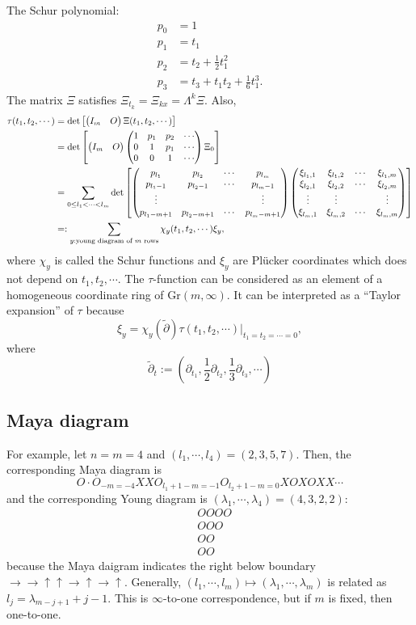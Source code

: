 \documentclass{../../../small}
\newcommand{\Gr}{\mathrm{Gr}}
\begin{document}
The Schur polynomial:
\begin{align*}
p_0&=1\\
p_1&=t_1\\
p_2&=t_2+\frac12t_1^2\\
p_3&=t_3+t_1t_2+\frac16t_1^3.
\end{align*}
The matrix $\Xi$ satisfies $\Xi_{t_k}=\Xi_{kx}=\Lambda^k\Xi$.
Also,
\begin{align*}
\tau(t_1,t_2,\cdots)
&=\det\left[\begin{pmatrix}I_m&O\end{pmatrix}\Xi(t_1,t_2,\cdots)\right]\\
&=\det\left[\begin{pmatrix}I_m&O\end{pmatrix}\begin{pmatrix}1&p_1&p_2&\cdots\\0&1&p_1&\cdots\\0&0&1&\cdots\end{pmatrix}\Xi_0\right]\\
&=\sum_{0\le l_1<\cdots<l_m}\det\left[
\begin{pmatrix}p_{l_1}&p_{l_2}&\cdots&p_{l_m}\\p_{l_1-1}&p_{l_2-1}&\cdots&p_{l_m-1}\\\vdots&&&\vdots\\p_{l_1-m+1}&p_{l_2-m+1}&\cdots&p_{l_m-m+1}\\\end{pmatrix}
\begin{pmatrix}\xi_{l_1,1}&\xi_{l_1,2}&\cdots&\xi_{l_1,m}\\\xi_{l_2,1}&\xi_{l_2,2}&\cdots&\xi_{l_2,m}\\\vdots&\vdots&&\vdots\\\xi_{l_m,1}&\xi_{l_m,2}&\cdots&\xi_{l_m,m}\\\end{pmatrix}
\right]\\
&=:\sum_{y:\text{young diagram of $m$ rows}}\chi_y(t_1,t_2,\cdots)\xi_y,
\end{align*}
where $\chi_y$ is called the Schur functions and $\xi_y$ are Pl\"ucker coordinates which does not depend on $t_1,t_2,\cdots$.
The $\tau$-function can be considered as an element of a homogeneous coordinate ring of $\Gr(m,\infty)$.
It can be interpreted as a ``Taylor expansion'' of $\tau$ because
\[\xi_y=\chi_y(\tilde\partial)\tau(t_1,t_2,\cdots)|_{t_1=t_2=\cdots=0},\]
where
\[\tilde\partial_t:=(\partial_{t_1},\frac12\partial_{t_2},\frac13\partial_{t_3},\cdots)\]



\subsection*{Maya diagram}

For example, let $n=m=4$ and $(l_1,\cdots,l_4)=(2,3,5,7)$.
Then, the corresponding Maya diagram is
\[O\cdot O_{-m=-4}XXO_{l_1+1-m=-1}O_{l_2+1-m=0}XOXOXX\cdots\]
and the corresponding Young diagram is $(\lambda_1,\cdots,\lambda_4)=(4,3,2,2)$:
\begin{align*}
&OOOO\\
&OOO\\
&OO\\
&OO
\end{align*}
because the Maya daigram indicates the right below boundary $\to\to\uparrow\uparrow\to\uparrow\to\uparrow$.
Generally, $(l_1,\cdots,l_m)\mapsto(\lambda_1,\cdots,\lambda_m)$ is related as $l_j=\lambda_{m-j+1}+j-1$.
This is $\infty$-to-one correspondence, but if $m$ is fixed, then one-to-one.
\end{document}
